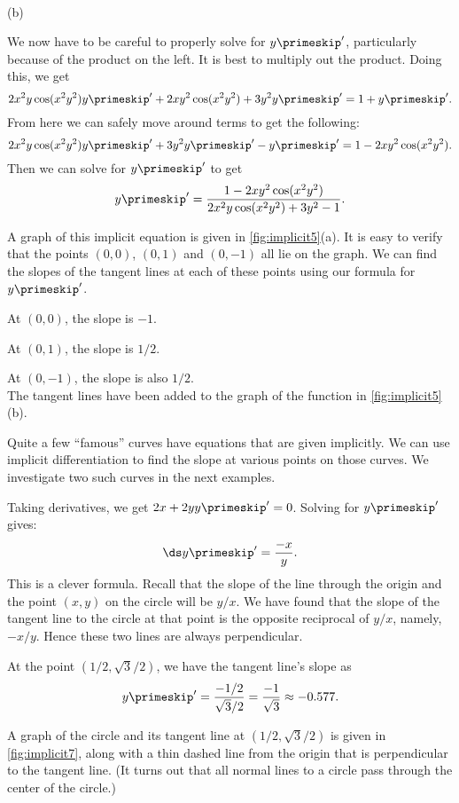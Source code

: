 {{
\\ (b) }

We now have to be careful to properly solve for $y\primeskip'$, particularly because of the product on the left.  It is best to multiply out the product.  Doing this, we get
$$2x^2y\cos(x^2y^2)y\primeskip' + 2xy^2\cos(x^2y^2) + 3y^2y\primeskip' = 1 + y\primeskip'.$$
From here we can safely move around terms to get the following:
$$2x^2y\cos(x^2y^2)y\primeskip' + 3y^2y\primeskip' - y\primeskip' = 1 - 2xy^2\cos(x^2y^2).$$
Then we can solve for $y\primeskip'$ to get
$$y\primeskip' = \frac{1 - 2xy^2\cos(x^2y^2)}{2x^2y\cos(x^2y^2)+3y^2-1}.$$

A graph of this implicit equation is given in \autoref{fig:implicit5}(a). It is easy to verify that the points $(0,0)$, $(0,1)$ and $(0,-1)$ all lie on the graph. We can find the slopes of the tangent lines at each of these points using our formula for $y\primeskip'$. 

At $(0,0)$, the slope is $-1$.

At $(0,1)$, the slope is $1/2$.

At $(0,-1)$, the slope is also $1/2$.\\
The tangent lines have been added to the graph of the function in \autoref{fig:implicit5}(b).}

Quite a few ``famous'' curves have equations that are given implicitly.  We can use implicit differentiation to find the slope at various points on those curves. We investigate two such curves in the next examples.\bigskip

{%
Taking derivatives, we get $2x+2yy\primeskip'=0$.  Solving for $y\primeskip'$  gives: $$\ds y\primeskip' = \frac{-x}{y}.$$ 
This is a clever formula. Recall that the slope of the line through the origin and the point $(x,y)$ on the circle will be $y/x$. We have found that the slope of the tangent line to the circle at that point is the opposite reciprocal of $y/x$, namely, $-x/y$. Hence these two lines are always perpendicular.

At the point $(1/2, \sqrt{3}/2)$, we have the tangent line's slope as
$$y\primeskip' = \frac{-1/2}{\sqrt{3}/2} = \frac{-1}{\sqrt{3}} \approx -0.577.$$

A graph of the circle and its tangent line at $(1/2,\sqrt{3}/2)$ is given in \autoref{fig:implicit7}, along with a thin dashed line from the origin that is perpendicular to the tangent line. (It turns out that all normal lines to a circle pass through the center of the circle.)
}


